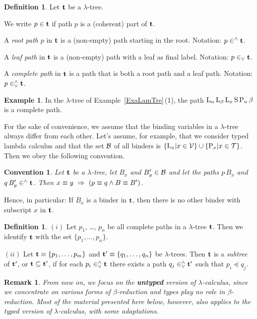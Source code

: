 \documentclass{article}
\theoremstyle{plain}
\newtheorem{Rem}[The]{Remark}
\newtheorem{Con}[The]{Convention}
\theoremstyle{definition}
\newtheorem{Def}[The]{Definition}
\newtheorem{Exa}[The]{Example}
\begin{document}
\begin{Def}
Let ${\bf t}$ be a $\lambda$-tree.

We write $p \in {\bf t}$ if path $p$ is a (coherent) part of ${\bf t}$.

A {\em root path\/} $p$ in ${\bf t}$ is a (non-empty) path starting in the root. Notation: $p \in^\wedge {\bf t}$.

A {\em leaf path\/} in ${\bf t}$ is a (non-empty) path with a leaf as final label. Notation: $p \in_\vee {\bf t}$.

A {\em complete path\/} in ${\bf t}$ is a path that is both a root path and a leaf path. Notation: $p \in^\wedge_\vee {\bf t}$.

\end{Def}

\begin{Exa}\label{ExaComPat}
In the $\lambda$-tree of Example~\ref{ExaLamTre}\,(1), the path ${\rm L}_\alpha \, {\rm L}_\beta \, {\rm L}_x \, {\rm S} \, {\rm P}_u \, \beta$ is a complete path.
\end{Exa}


For the sake of convenience, we assume that the binding variables in a $\lambda$-tree always differ from each other. Let's assume, for example, that we consider typed lambda calculus and that the set ${\cal B}$ of all binders is $\{{\rm L}_x | x \in {\cal V}\} \cup \{{\rm P}_x | x \in {\cal T}\}$. Then we obey the following convention.

\begin{Con}
Let ${\bf t}$ be a $\lambda$-tree, let $B_x$ and $B'_y \in {\cal B}$ and let the paths $p \, B_x$ and $q \, B'_y \in^\wedge {\bf t}$. Then $ x \equiv y ~\Rightarrow~ (p \equiv q \wedge B \equiv B')$.
\end{Con}

Hence, in particular: If $B_x$ is a binder in ${\bf t}$, then there is no other binder with subscript $x$ in ${\bf t}$.

\begin{Def}
$(i)$ Let $p_1$, \ldots, $p_n$ be all complete paths in a $\lambda$-tree ${\bf t}$. Then we  identify ${\bf t}$ with the set $\{p_1, \ldots, p_n\}$.

$(ii)$ Let ${\bf t} \equiv \{p_1,\ldots,p_m\}$ and ${\bf t}' \equiv \{q_1,\ldots,q_n \}$ be $\lambda$-trees. Then ${\bf t}$ is a {\em subtree\/} of ${\bf t}'$, or ${\bf t} \subseteq {\bf t}'$, if for each $p_i \in^\wedge_\vee {\bf t}$ there exists a path $q_j \in^\wedge_\vee {\bf t}'$ such that $p_i \preceq q_j$.
\end{Def}


\begin{Rem}
From now on, we focus on the {\bf untyped} version of $\lambda$-calculus, since we concentrate on various forms of $\beta$-reduction and types play no role in $\beta$-reduction. Most of the material presented here below, however, also applies to the {\em typed}\/ version of $\lambda$-calculus, with some adaptations. %
\end{Rem}
\end{document}
